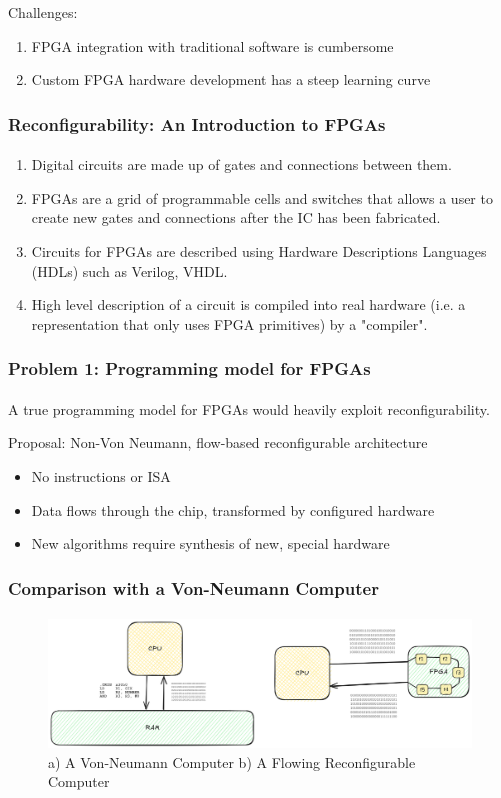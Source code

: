 \documentclass{beamer}
\begin{document}
{\begin{frame}[fragile]
Challenges:
  \begin{enumerate}
    \item FPGA integration with traditional software is cumbersome
    \item Custom FPGA hardware development has a steep learning curve
  \end{enumerate}
\end{frame}

\begin{frame}[fragile]
\frametitle{Reconfigurability: An Introduction to FPGAs}
\framesubtitle{}
  \begin{enumerate}
    \item Digital circuits are made up of gates and connections between
      them.
    \item FPGAs are a grid of programmable cells and switches that allows
      a user to create new gates and connections after the IC has been
      fabricated.
    \item Circuits for FPGAs are described using Hardware Descriptions Languages
      (HDLs) such as Verilog, VHDL.
    \item High level description of a circuit is compiled into real hardware
      (i.e. a representation that only uses FPGA primitives) by a "compiler".
  \end{enumerate}

\end{frame}

\begin{frame}[fragile]
\frametitle{Problem 1: Programming model for FPGAs}
\framesubtitle{}
  A true programming model for FPGAs would heavily exploit reconfigurability.

Proposal: Non-Von Neumann, flow-based reconfigurable architecture
  \begin{itemize}
    \item No instructions or ISA
    \item Data flows through the chip, transformed by configured hardware
    \item New algorithms require synthesis of new, special hardware
  \end{itemize}
\end{frame}

\begin{frame}[fragile]
  \frametitle{Comparison with a Von-Neumann Computer}
  \framesubtitle{}
  \begin{figure}
    \centering
    \includegraphics[width=1.0\textwidth]{images/flow.png}
    \caption{a) A Von-Neumann Computer b) A Flowing Reconfigurable Computer}
    \label{}
  \end{figure}
\end{frame}

}
\end{document}
